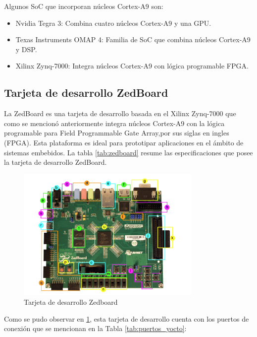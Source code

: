 Algunos SoC que incorporan núcleos Cortex-A9 son:

\begin{itemize}
    \item Nvidia Tegra 3: Combina cuatro núcleos Cortex-A9 y una GPU.
    \item Texas Instruments OMAP 4: Familia de SoC que combina núcleos Cortex-A9 y DSP.
    \item Xilinx Zynq-7000: Integra núcleos Cortex-A9 con lógica programable FPGA.
\end{itemize}

\subsection{Tarjeta de desarrollo ZedBoard}

La ZedBoard es una tarjeta de desarrollo basada en el Xilinx Zynq-7000 que como se mencionó anteriormente integra núcleos Cortex-A9 con la lógica programable 
para Field Programmable Gate Array,por sus siglas en ingles (FPGA). Esta plataforma es ideal para prototipar aplicaciones en el ámbito de sistemas embebidos. La tabla \ref{tab:zedboard} 
resume las especificaciones que posee la tarjeta de desarrollo ZedBoard.


\begin{figure}[h!]
    \centering
    \includegraphics[width=0.8\textwidth]{fig/teorico/zedboard_raw.png}
    \caption{Tarjeta de desarrollo Zedboard}
    \label{fig:zedboard_raw_info}
\end{figure}

Como se pudo observar en \ref{fig:zedboard_raw_info}, esta tarjeta de desarrollo cuenta con los puertos de conexión que se mencionan en la Tabla \ref{tab:puertos_yocto}: 

